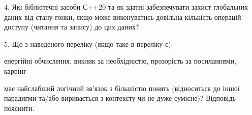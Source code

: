 \documentclass[12pt, ukrainian]{article}
\begin{document}
\begin {large}
{\vspace{5mm}
4. Які бібліотечні засоби С++20 та як здатні забезпечувати захист глобальних даних від стану гонки, якщо може виконуватись довільна кількість операцій доступу (читання та запису) до цих даних?



\vspace{5mm}
5. Що з наведеного переліку (якщо таке в переліку є):

\vspace{4mm}
\qquad енергійні обчислення, виклик за необхідністю, прозорість за посиланнями, каррінг

\vspace{4mm}
має найслабший логічний зв’язок з більшістю понять (відноситься до іншої парадигми та/або виривається з контексту чи не дуже сумісне)? Відповідь пояснити.

}
\end {large}
\end{document}
